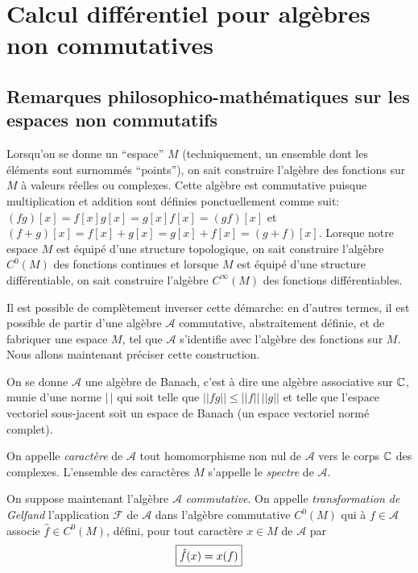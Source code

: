 
\chapter{Calcul diff\'erentiel pour alg\`ebres non commutatives}

\section{Remarques philosophico-math\'ematiques sur les espaces non 
commutatifs}

Lorsqu'on se donne un ``espace'' $M$ (techniquement, un ensemble dont 
les \'el\'ements sont surnomm\'es ``points''), on sait construire l'alg\`ebre 
des fonctions sur $M$ \`a valeurs r\'eelles ou complexes. Cette alg\`ebre 
est commutative puisque multiplication et addition sont d\'efinies 
ponctuellement comme suit: $(fg)[x] =  f[x]g[x]=g[x]f[x]=(gf)[x]$ 
et $(f+g)[x] =  f[x]+g[x]=g[x]+f[x]=(g+f)[x]$. Lorsque notre 
espace $M$ est \'equip\'e d'une structure topologique, on sait construire 
l'alg\`ebre $C^{0}(M)$ des fonctions continues et lorsque $M$ est \'equip\'e d'une
 structure diff\'erentiable, on sait construire  l'alg\`ebre
$C^{\infty}(M)$ des fonctions diff\'erentiables.

Il est possible de compl\`etement inverser cette d\'emarche: en d'autres termes, il 
est possible de partir d'une alg\`ebre ${\mathcal A}$ commutative, abstraitement 
d\'efinie, et de fabriquer une espace $M$, tel que  ${\mathcal A}$ 
s'identifie avec l'alg\`ebre des fonctions sur $M$.
Nous allons maintenant pr\'eciser cette construction.

On se donne ${\mathcal A}$ une alg\`ebre de Banach, c'est \`a dire 
une alg\`ebre associative sur $\mathbb{C}$, munie d'une norme $\vert \, 
\vert$ qui soit telle que $\vert \vert f g \vert\vert \leq \vert\vert f \vert\vert \, \vert\vert g 
\vert\vert$ et telle que l'espace vectoriel sous-jacent soit un espace de 
Banach (un espace vectoriel norm\'e complet).

On appelle {\sl caract\`ere\/} de ${\mathcal A}$ tout homomorphisme 
non nul de ${\mathcal A}$ vers le corps $\mathbb{C}$ des complexes. 
L'ensemble des caract\`eres $M$ s'appelle le {\sl 
spectre\/} de ${\mathcal A}$. 

On suppose maintenant l'alg\`ebre ${\mathcal A}$ {\sl commutative\/}.
On appelle {\sl transformation de Gelfand \/}  l'application
${\mathcal  F}$ de ${\mathcal A}$ dans l'alg\`ebre commutative ${C^{0}(M)}$ 
qui \`a $f \in {\mathcal A}$ associe $\hat f \in {C^{0}(M)}$, 
d\'efini, pour tout caract\`ere $x \in M$ de ${\mathcal A}$ par
$$
\mbox{\fbox{$
\hat f(x) = x(f)
$}}
$$

